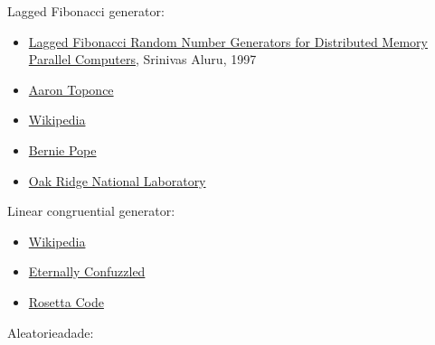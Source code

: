 \documentclass[12pt]{article}
\begin{document}
Lagged Fibonacci generator:
\begin{itemize}
  \item
    \href{http://astro.uchicago.edu/~andrey/classes/rseminar/docs/aluru.pdf}
    {Lagged Fibonacci Random Number Generators for Distributed Memory Parallel
    Computers}, Srinivas Aluru, 1997
  \item \href{https://pthree.org/2015/05/29/the-lagged-fibonacci-generator/}
    {Aaron Toponce}
  \item \href{https://en.wikipedia.org/wiki/Lagged_Fibonacci_generator}
    {Wikipedia}
  \item \href{http://berniepope.id.au/lfg.html}{Bernie Pope}
  \item \href{https://www.phy.ornl.gov/csep/rn/node20.html}{Oak Ridge National
    Laboratory}
\end{itemize}

Linear congruential generator:
\begin{itemize}
  \item \href{https://en.wikipedia.org/wiki/Linear_congruential_generator}
  {Wikipedia}
  \item \href {http://www.eternallyconfuzzled.com/tuts/algorithms/jsw_tut_rand.aspx}
  {Eternally Confuzzled}
  \item \href{https://rosettacode.org/wiki/Linear_congruential_generator}
  {Rosetta Code}
\end{itemize}

Aleatorieadade:
\end{document}
